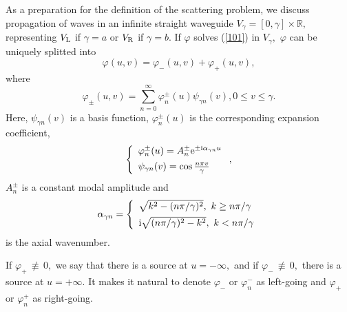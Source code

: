 \documentclass[numreferences]{kluwer}
\renewcommand{\phi}{\varphi}
\begin{document}
As a preparation for the definition of the scattering problem, we
discuss propagation of waves in an infinite straight waveguide
$V_{\gamma}=[0,\gamma]\times\mathbb{R},$ representing $V_{\rm L}$ if
$\gamma=a$ or $V_{\rm R}$ if $\gamma=b$. If $\phi$ solves (\ref{101}) in
$V_{\gamma},$ $\phi$ can be uniquely splitted into
\begin{equation}
  \phi(u,v)=\phi_{-}(u,v)+\phi_{+}(u,v), \label{103}
\end{equation}
where%
\begin{equation}\label{103.2}
  \phi_{\pm}(u,v)=\sum_{n=0}^{\infty}\phi_{n}^{\pm}(u)\psi
  _{\gamma n}(v),0\leq v\leq \gamma.
\end{equation}
Here, $\psi _{\gamma n}(v)$ is a basis function, $\phi_{n}^{\pm}(u)$
is the corresponding expansion coefficient,
\begin{equation}
  \left\{
    \begin{array}
      [c]{l}%
      \phi_{n}^{\pm}(u)=A_{n}^{\pm}\text{e}^{\pm\text{i}\alpha_{\gamma n}u}\\[1ex]%
      \psi
      _{\gamma n}(v)=\cos\frac{n\pi v}{\gamma}
    \end{array}
  \right.  , \label{103.4}%
\end{equation}
$A_{n}^{\pm}$ is a constant modal amplitude and
\begin{equation}
  \alpha_{\gamma n}=\left\{
    \begin{array}
      [c]{l}%
      \sqrt{k^{2}-(n\pi/\gamma)^{2}},\text{ }k\geq n\pi/\gamma\\[1ex]%
      \text{i}\sqrt{(n\pi/\gamma)^{2}-k^{2}},\text{ }k<n\pi/\gamma%
    \end{array}
  \right.   \label{106}%
\end{equation}
is the axial wavenumber.

If $\phi_{+}\,\nequiv\, 0,$ we say that there is a source at
$u=-\infty,$ and if $\phi_{-}\,\nequiv\, 0,$ there is a source at
$u=+\infty.$ It makes it natural to denote $\phi_{-}$ or
$\phi_{n}^{-}$ as left-going and $\phi_{+}$ or $\phi_{n}^{+}$ as
right-going.
\end{document}
